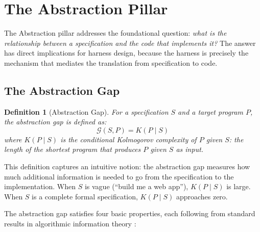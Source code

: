 \documentclass[11pt, a4paper]{googledeepmind}
\newtheorem{definition}{Definition}[section]
\begin{document}
\section{The Abstraction Pillar}
\label{sec:abstraction}

The Abstraction pillar addresses the foundational question: \emph{what is the relationship between a specification and the code that implements it?} The answer has direct implications for harness design, because the harness is precisely the mechanism that mediates the translation from specification to code.

\subsection{The Abstraction Gap}

\begin{definition}[Abstraction Gap]
\label{def:abstraction-gap}
For a specification $S$ and a target program $P$, the \emph{abstraction gap} is defined as:
\begin{equation}
    \mathcal{G}(S, P) = K(P \mid S)
\end{equation}
where $K(P \mid S)$ is the conditional Kolmogorov complexity of $P$ given $S$: the length of the shortest program that produces $P$ given $S$ as input.
\end{definition}

This definition captures an intuitive notion: the abstraction gap measures how much additional information is needed to go from the specification to the implementation. When $S$ is vague (``build me a web app''), $K(P \mid S)$ is large. When $S$ is a complete formal specification, $K(P \mid S)$ approaches zero.

The abstraction gap satisfies four basic properties, each following from standard results in algorithmic information theory \citep{li2019introduction}:
\end{document}
